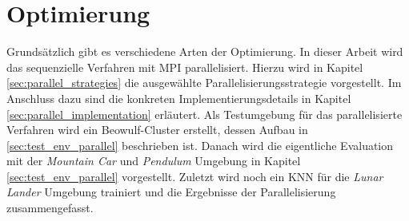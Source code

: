 \chapter{Optimierung}
\label{chap:optimization}
Grundsätzlich gibt es verschiedene Arten der Optimierung. In dieser Arbeit wird das sequenzielle Verfahren mit \ac{MPI} parallelisiert. Hierzu wird in Kapitel \ref{sec:parallel_strategies} die ausgewählte Parallelisierungsstrategie vorgestellt. Im Anschluss dazu sind die konkreten Implementierungsdetails in Kapitel \ref{sec:parallel_implementation} erläutert. Als Testumgebung für das parallelisierte Verfahren wird ein Beowulf-Cluster erstellt, dessen Aufbau in \ref{sec:test_env_parallel} beschrieben ist. Danach wird die eigentliche Evaluation mit der \emph{Mountain Car} und \emph{Pendulum} Umgebung in Kapitel \ref{sec:test_env_parallel} vorgestellt. Zuletzt wird noch ein \ac{KNN} für die \emph{Lunar Lander} Umgebung trainiert und die Ergebnisse der Parallelisierung zusammengefasst.








